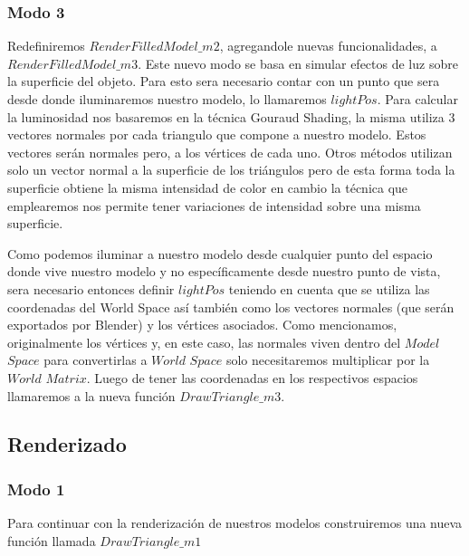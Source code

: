 \documentclass[a4paper]{article}
\newcounter{col}
\begin{document}
\subsubsection{Modo 3}  

Redefiniremos $RenderFilledModel\_m2$, agregandole nuevas funcionalidades, a $RenderFilledModel\_m3$. Este nuevo modo se basa en simular efectos de luz sobre la superficie del objeto. Para esto sera necesario contar con un punto que sera desde donde iluminaremos nuestro modelo, lo llamaremos $lightPos$. Para calcular la luminosidad nos basaremos en la técnica Gouraud Shading, la misma utiliza 3 vectores normales por cada triangulo que compone a nuestro modelo. Estos vectores serán normales pero, a los vértices de cada uno. Otros métodos utilizan solo un vector normal a la superficie de los triángulos pero de esta forma toda la superficie obtiene la misma intensidad de color en cambio la técnica que emplearemos nos permite tener variaciones de intensidad sobre una misma superficie. 
\par Como podemos iluminar a nuestro modelo desde cualquier punto del espacio donde vive nuestro modelo y no específicamente desde nuestro punto de vista, sera necesario entonces definir $lightPos$ teniendo en cuenta que se utiliza las coordenadas del World Space así también como los vectores normales (que serán exportados por Blender) y los vértices asociados. Como mencionamos, originalmente los vértices y, en este caso, las normales viven dentro del $Model$ $Space$ para convertirlas a $World$ $Space$ solo necesitaremos multiplicar por la $World$ $Matrix$.  Luego de tener las coordenadas en los respectivos espacios llamaremos a la nueva función $DrawTriangle\_m3$.


\subsection{Renderizado}
\subsubsection{Modo 1} \label{sdlmodo1}


Para continuar con la renderización de nuestros modelos construiremos una nueva función llamada $DrawTriangle\_m1$ \\
\end{document}
